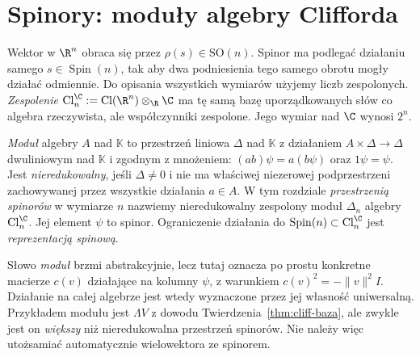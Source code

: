 \section{Spinory: moduły algebry Clifforda}
\label{sec:spinory}

Wektor w $\R^n$ obraca się przez $\rho(s)\in\mathrm{SO}(n)$.
Spinor ma podlegać działaniu samego $s\in\operatorname{Spin}(n)$,
tak aby dwa podniesienia tego samego obrotu mogły
działać odmiennie. Do opisania wszystkich wymiarów
użyjemy liczb zespolonych. \emph{Zespolenie}
$\operatorname{Cl}^{\C}_n:=
\operatorname{Cl}(\R^n)\otimes_\R\C$
ma tę samą bazę uporządkowanych słów co algebra
rzeczywista, ale współczynniki zespolone.
Jego wymiar nad $\C$ wynosi $2^n$.

\begin{definicja}
\label{def:spinor}
\emph{Moduł} algebry $A$ nad $\mathbb K$ to przestrzeń liniowa
$\Delta$ nad $\mathbb K$ z działaniem $A\times\Delta\to\Delta$
dwuliniowym nad $\mathbb K$ i zgodnym
z mnożeniem: $(ab)\psi=a(b\psi)$
oraz $1\psi=\psi$. Jest \emph{nieredukowalny},
jeśli $\Delta\ne0$ i nie ma właściwej niezerowej podprzestrzeni
zachowywanej przez wszystkie działania $a\in A$.
W tym rozdziale \emph{przestrzenią spinorów}
w wymiarze $n$ nazwiemy nieredukowalny zespolony
moduł $\Delta_n$ algebry $\operatorname{Cl}^{\C}_n$.
Jej element $\psi$ to spinor. Ograniczenie
działania do $\operatorname{Spin}(n)\subset
\operatorname{Cl}^{\C}_n$ jest
\emph{reprezentacją spinową}.
\end{definicja}

Słowo \emph{moduł} brzmi abstrakcyjnie, lecz tutaj
oznacza po prostu konkretne macierze $c(v)$
działające na kolumny $\psi$, z warunkiem
$c(v)^2=-\|v\|^2 I$. Działanie na całej algebrze
jest wtedy wyznaczone przez jej własność uniwersalną.
Przykładem modułu jest $\Lambda V$ z dowodu
Twierdzenia~\ref{thm:cliff-baza}, ale zwykle jest
on \emph{większy} niż nieredukowalna przestrzeń
spinorów. Nie należy więc utożsamiać automatycznie
wielowektora ze spinorem.

